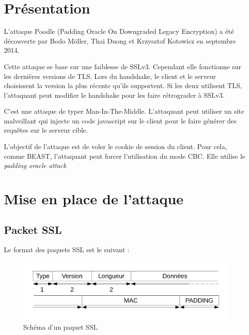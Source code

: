 
\chapter{Présentation}
\label{chapter:poodlePres}

L'attaque Poodle (Padding Oracle On Downgraded Legacy Encryption)
a été découverte par Bodo Möller, Thai Duong et 
Krzysztof Kotowicz en septembre 2014.

Cette attaque se base sur une faiblesse de SSLv3.
Cependant elle fonctionne sur les dernières versions de TLS.
Lors du handshake, le client et le serveur choisissent la version
la plus récente qu'ils supportent. Si les deux utilisent TLS,
l'attaquant peut modifier le handshake pour les faire rétrograder
à SSLv3.

C'est une attaque de typer Man-In-The-Middle.
L'attaquant peut utiliser un site malveillant qui injecte un
code javascript sur le client pour le faire générer des requêtes
sur le serveur cible.

L'objectif de l'attaque est de voler le cookie de session 
du client. Pour cela, comme BEAST, l'attaquant peut forcer 
l'utilisation du mode CBC. Elle utilise le \emph{padding oracle attack }

\chapter{Mise en place de l'attaque}
\label{chapter:Poodleattack}

\section{Packet SSL}
\label{sec:packet}

Le format des paquets SSL est le suivant : 

\begin{figure}[h] 
  \centering
  \includegraphics[scale=0.5]{schemaSSL2.pdf}
  \caption{Schéma d'un paquet SSL}
  \label{fig:ssl}
\end{figure}



